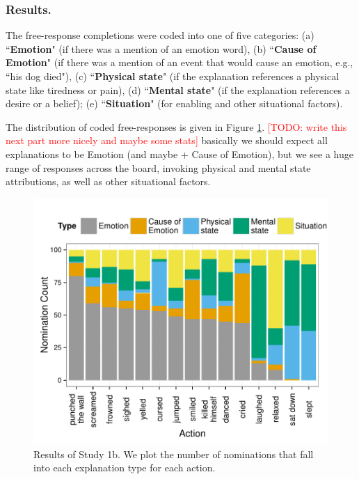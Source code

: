 \documentclass[10pt,letterpaper]{article}
\newcommand{\red}[1]{\textcolor{Red}{#1}}
\begin{document}
\subsubsection{Results.} 
The free-response completions were coded into one of five categories: (a) ``\textbf{Emotion}" (if there was a mention of an emotion word), (b) ``\textbf{Cause of Emotion}" (if there was a mention of an event that would cause an emotion, e.g., ``his dog died"), (c) ``\textbf{Physical state}" (if the explanation references a physical state like tiredness or pain), (d) ``\textbf{Mental state}" (if the explanation references a desire or a belief); (e) ``\textbf{Situation}" (for enabling and other situational factors). 

The distribution of coded free-responses is given in Figure \ref{Study1bResultsFig}. \red{[TODO: write this next part more nicely and maybe some stats]} basically we should expect all explanations to be Emotion (and maybe + Cause of Emotion), but we see a huge range of responses across the board, invoking physical and mental state attributions, as well as other situational factors.

\begin{figure}[htb!]
\begin{center}\includegraphics[width=1\columnwidth]{images/study1b_codePlot.pdf}\end{center}
\caption{ Results of Study 1b. We plot the number of nominations that fall into each explanation type for each action. }
\label{Study1bResultsFig}
\end{figure}
\end{document}
